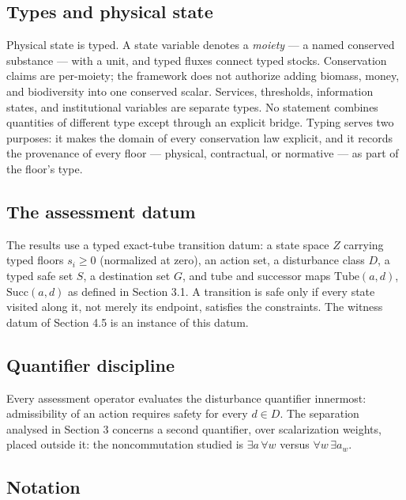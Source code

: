 \documentclass[review,11pt]{elsarticle}
\begin{document}
\subsection{Types and physical
state}\label{types-and-physical-state}

Physical state is typed. A state variable denotes a \emph{moiety} --- a
named conserved substance --- with a unit, and typed fluxes connect
typed stocks. Conservation claims are per-moiety; the framework does not
authorize adding biomass, money, and biodiversity into one conserved
scalar. Services, thresholds, information states, and institutional
variables are separate types. No statement combines quantities of different type except through an explicit bridge. Typing serves two purposes: it makes the domain of every
conservation law explicit, and it records the provenance of every floor
--- physical, contractual, or normative --- as part of the floor's type.

\subsection{The assessment datum}\label{the-assessment-datum}

The results use a typed exact-tube transition datum: a state space \(Z\) carrying typed floors \(s_i \ge 0\) (normalized at zero), an action set, a disturbance class \(D\), a typed safe set \(S\), a destination set \(G\), and tube and successor maps \(\mathrm{Tube}(a,d)\), \(\mathrm{Succ}(a,d)\) as defined in Section 3.1. A transition is safe only if every state visited along it, not merely its endpoint, satisfies the constraints. The witness datum of Section 4.5 is an instance of this datum.

\subsection{Quantifier discipline}\label{quantifier-discipline}

Every assessment operator evaluates the disturbance quantifier innermost: admissibility of an action requires safety for every \(d \in D\). The separation analysed in Section 3 concerns a second quantifier, over scalarization weights, placed outside it: the noncommutation studied is \(\exists a\, \forall w\) versus \(\forall w\, \exists a_w\).

\subsection{Notation}\label{notation}
\end{document}
